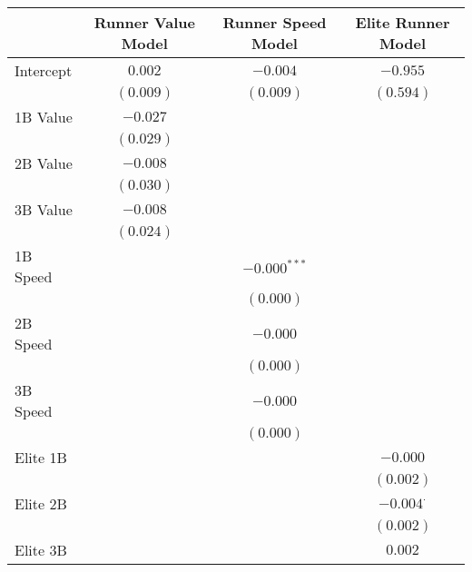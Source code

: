 
\begin{table}
\begin{center}
\begin{tabular}{l c c c}
\toprule
 & Runner Value Model & Runner Speed Model & Elite Runner Model \\
\midrule
Intercept                      & $0.002$        & $-0.004$       & $-0.955$         \\
                               & $(0.009)$      & $(0.009)$      & $(0.594)$        \\
1B Value                       & $-0.027$       &                &                  \\
                               & $(0.029)$      &                &                  \\
2B Value                       & $-0.008$       &                &                  \\
                               & $(0.030)$      &                &                  \\
3B Value                       & $-0.008$       &                &                  \\
                               & $(0.024)$      &                &                  \\
1B Speed                       &                & $-0.000^{***}$ &                  \\
                               &                & $(0.000)$      &                  \\
2B Speed                       &                & $-0.000$       &                  \\
                               &                & $(0.000)$      &                  \\
3B Speed                       &                & $-0.000$       &                  \\
                               &                & $(0.000)$      &                  \\
Elite 1B                       &                &                & $-0.000$         \\
                               &                &                & $(0.002)$        \\
Elite 2B                       &                &                & $-0.004^{\cdot}$ \\
                               &                &                & $(0.002)$        \\
Elite 3B                       &                &                & $0.002$          \\

\end{tabular}
\end{center}
\end{table}
